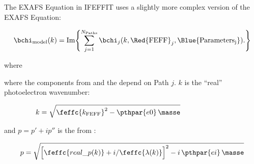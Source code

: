 \begin{slide}{The EXAFS Equation in IFEFFIT }
    \vmm  
    {\ifeffit} uses a slightly more complex version of the EXAFS Equation:
    
    \[ 
    {\displaystyle{ 
        \bchi_{\rm model}(k) = {\rm Im} \Biggl\{ 
        \sum_{j=1}^{N_{\rm Paths}}
        \bchi_j(k, {\Red{\rm FEFF}}_j, {\Blue{\rm Parameters_j}}). }}
    \Biggr\}
    \]
    
    where \vmm
    
    
    \vmm 
    where the components from {\Red{\feff}} and the {} depend on Path
    $j$.  
    ${k}$ is the ``real'' photoelectron wavenumber:
    
    \vspace{-1mm}
    \[ {k} = {\sqrt{ \feffc{k_{\rm FEFF}}^2 - \pthpar{e0}\,
        \masse}}\hspace{24mm}
    \]
    
    and {{${p = p' + ip''}$}} is the {} 
    from {\feff}:
    
    \vspace{-1mm}
    \[
    {p} = {  \sqrt{ \Bigl[ {\feffc{real\_p(k)}} +
        { i / \feffc{\lambda(k)}} \Bigr]^2 - i \,  \pthpar{ei} \, \masse  }} 
    \]
    
  \vfill
\end{slide} 




